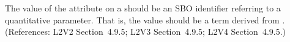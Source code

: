 The value of the  attribute on a \Parameter should be an SBO
identifier referring to a quantitative parameter.  That is, the value should
be a term derived from \sboparameter.  (References: L2V2 Section~4.9.5; L2V3
Section~4.9.5; L2V4 Section~4.9.5.)
